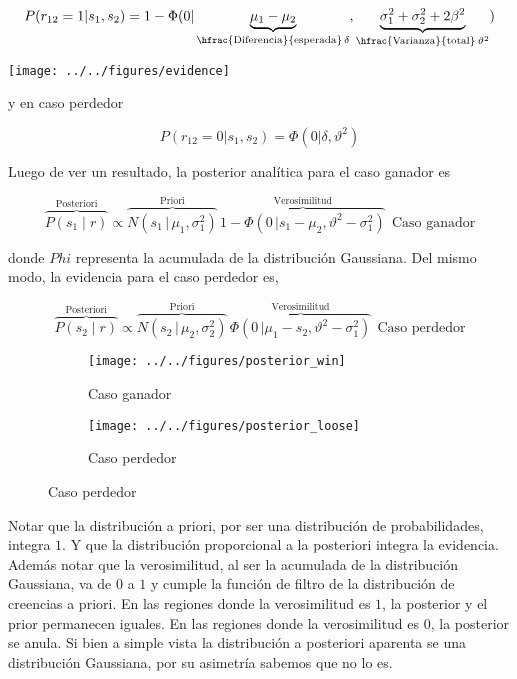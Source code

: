 \documentclass[a4paper,10pt]{article}
\begin{document}
\begin{equation}
 P(r_{12}=1|s_1,s_2) = 1-\Phi(0| \underbrace{\mu_1 - \mu_2}_{ \hfrac{\text{Diferencia}}{\text{esperada}} \, \delta }, \underbrace{\sigma_1^2 + \sigma_2^2 + 2\beta^2}_{\hfrac{\text{Varianza}}{\text{total}} \, \vartheta^2 })
 \end{equation}
\begin{center}
\texttt{[image: ../../figures/evidence]} 
\end{center}

y en caso perdedor

\begin{equation}
 P(r_{12}=0|s_1,s_2) = \Phi(0| \delta, \vartheta^2)
 \end{equation}

Luego de ver un resultado, la posterior anal\'itica para el caso ganador es

\begin{equation}
\overbrace{P(s_1 \mid r)}^{\text{Posteriori}} \propto \overbrace{N(s_1 \, | \, \mu_1, \sigma_1^2) }^{\text{Priori}} \, \overbrace{1-\Phi(0 \, | s_1 - \mu_2 , \vartheta^2 - \sigma_1^2)}^{\text{Verosimilitud}}  \ \  \text{Caso ganador} 
\end{equation}

donde $Phi$ representa la acumulada de la distribuci\'on Gaussiana.
Del mismo modo, la evidencia para el caso perdedor es,

\begin{equation*}
\overbrace{P(s_2 \mid r)}^{\text{Posteriori}} \propto \overbrace{N(s_2 \, | \,\mu_2, \sigma_2^2) }^{\text{Priori}} \, \overbrace{\Phi(0  \, | \mu_1 - s_2, \vartheta^2 - \sigma_1^2)}^{\text{Verosimilitud}}  \ \  \text{Caso perdedor} 
\end{equation*}

\begin{figure}[H]
\begin{subfigure}[b]{0.49\textwidth}
 \texttt{[image: ../../figures/posterior\_win]}
 \caption{Caso ganador}
\end{subfigure}
\begin{subfigure}[b]{0.49\textwidth}
\texttt{[image: ../../figures/posterior\_loose]}
\caption{Caso perdedor}
\end{subfigure}
\end{figure}

Notar que la distribuci\'on a priori, por ser una distribuci\'on de probabilidades, integra $1$. Y que la distribuci\'on proporcional a la posteriori integra la evidencia.
Adem\'as notar que la verosimilitud, al ser la acumulada de la distribuci\'on Gaussiana, va de $0$ a $1$ y cumple la funci\'on de filtro de la distribuci\'on de creencias a priori.
En las regiones donde la verosimilitud es $1$, la posterior y el prior permanecen iguales.
En las regiones donde la verosimilitud es $0$, la posterior se anula.
Si bien a simple vista la distribuci\'on a posteriori aparenta se una distribuci\'on Gaussiana, por su asimetr\'ia sabemos que no lo es.
\end{document}
